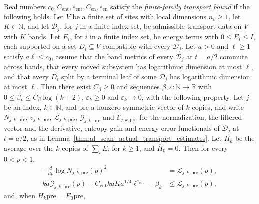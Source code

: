 \begin{definition}
    \label{def:al_scan_finite_family_transport_bound}
    \leanok
    Real numbers $c_0,C_{\mathrm{ent}},e_{\mathrm{ent}},C_{\mathrm{en}},e_{\mathrm{en}}$
    satisfy the \emph{finite-family transport bound} if the following holds.
    Let $V$ be a finite set of sites with local dimensions $n_v\ge1$, let
    $K\in\mathbb N$, and let $\mathscr D_j$, for $j$ in a finite index set,
    be admissible transport data on $V$ with $K$ bands. Let $E_i$, for $i$
    in a finite index set, be energy terms with $0\le E_i\le I$, each
    supported on a set $D_i\subseteq V$ compatible with every
    $\mathscr D_j$. Let $a>0$ and $\ell\ge1$ satisfy $a\ell\le c_0$, assume
    that the band metrics of every $\mathscr D_j$ at $t=a/2$ commute
    across bands, that every moved subsystem has logarithmic dimension at
    most $\ell$, and that every $D_i$ split by a terminal leaf of some
    $\mathscr D_j$ has logarithmic dimension at most $\ell$. Then there
    exist $C_\beta\ge0$ and sequences $\beta,\varepsilon:\mathbb N\to\mathbb R$
    with $0\le\beta_k\le C_\beta\log(k+2)$, $\varepsilon_k\ge0$ and
    $\varepsilon_k\to0$, with the following property. Let $j$ be an index,
    $k\in\mathbb N$, and $\mathrm{pre}$ a nonzero symmetric vector of $k$
    copies, and write $N_{j,k,\mathrm{pre}}$, $v_{j,k,\mathrm{pre}}$,
    $\mathcal L_{j,k,\mathrm{pre}}$, $\mathcal G_{j,k,\mathrm{pre}}$ and
    $\mathcal E_{j,k,\mathrm{pre}}$ for the normalization, the filtered
    vector and the derivative, entropy-gain and energy-error functionals of
    $\mathscr D_j$ at $t=a/2$, as in
    Lemma~\ref{thm:al_scan_actual_transport_estimates}. Let
    $\overline H_k$ be the average over the $k$ copies of $\sum_iE_i$ for
    $k\ge1$, and $\overline H_0=0$. Then
    for every $0<p<1$,
    \begin{align}
        -\frac{d}{dp}\log N_{j,k,\mathrm{pre}}(p)^2
         & =\mathcal L_{j,k,\mathrm{pre}}(p),   \\
        ka\mathcal G_{j,k,\mathrm{pre}}(p)
        -C_{\mathrm{ent}}kaK a^{1/4}\ell^{e_{\mathrm{ent}}}-\beta_k
         & \le\mathcal L_{j,k,\mathrm{pre}}(p),
    \end{align}
    and, when $\overline H_k\mathrm{pre}=E_0\mathrm{pre}$,

\end{definition}
